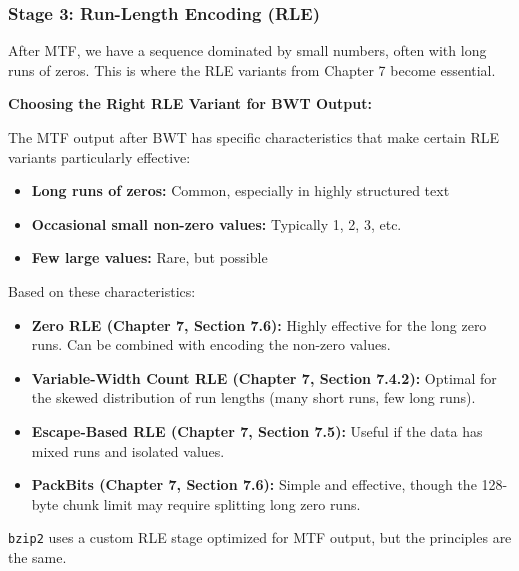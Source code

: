 \subsubsection{Stage 3: Run-Length Encoding (RLE)}

After MTF, we have a sequence dominated by small numbers, often with long runs of zeros. This is where the RLE variants from Chapter 7 become essential.

\begin{importantbox}
\textbf{Choosing the Right RLE Variant for BWT Output:}

The MTF output after BWT has specific characteristics that make certain RLE variants particularly effective:

\begin{itemize}
    \item \textbf{Long runs of zeros:} Common, especially in highly structured text
    \item \textbf{Occasional small non-zero values:} Typically 1, 2, 3, etc.
    \item \textbf{Few large values:} Rare, but possible
\end{itemize}

Based on these characteristics:
\begin{itemize}
    \item \textbf{Zero RLE (Chapter 7, Section 7.6):} Highly effective for the long zero runs. Can be combined with encoding the non-zero values.
    
    \item \textbf{Variable-Width Count RLE (Chapter 7, Section 7.4.2):} Optimal for the skewed distribution of run lengths (many short runs, few long runs).
    
    \item \textbf{Escape-Based RLE (Chapter 7, Section 7.5):} Useful if the data has mixed runs and isolated values.
    
    \item \textbf{PackBits (Chapter 7, Section 7.6):} Simple and effective, though the 128-byte chunk limit may require splitting long zero runs.
\end{itemize}

\texttt{bzip2} uses a custom RLE stage optimized for MTF output, but the principles are the same.
\end{importantbox}

